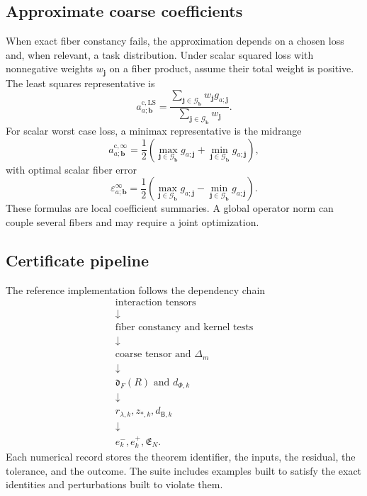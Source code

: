 \documentclass[11pt]{article}
\theoremstyle{definition}
\theoremstyle{remark}
\newcommand{\cG}{\mathcal G}
\newcommand{\coarse}{\mathrm c}
\newcommand{\Bup}{\mathsf B}
\newcommand{\Err}{\mathfrak E}
\begin{document}
\subsection{Approximate coarse coefficients}
When exact fiber constancy fails, the approximation depends on a chosen loss and, when relevant, a task distribution.  Under scalar squared loss with nonnegative weights $w_{\mathbf j}$ on a fiber product, assume their total weight is positive.  The least squares representative is
\begin{equation}\label{eq:least-squares-coarse-coeff}
  a^{\coarse,\mathrm{LS}}_{a;\mathbf b}
  =
  \frac{
  \sum_{\mathbf j\in\cG_{\mathbf b}}
  w_{\mathbf j}g_{a;\mathbf j}
  }{
  \sum_{\mathbf j\in\cG_{\mathbf b}}w_{\mathbf j}
  }.
\end{equation}
For scalar worst case loss, a minimax representative is the midrange
\begin{equation}\label{eq:minimax-coarse-coeff}
  a^{\coarse,\infty}_{a;\mathbf b}
  =
  \frac12
  \left(
  \max_{\mathbf j\in\cG_{\mathbf b}}g_{a;\mathbf j}
  +
  \min_{\mathbf j\in\cG_{\mathbf b}}g_{a;\mathbf j}
  \right),
\end{equation}
with optimal scalar fiber error
\begin{equation}\label{eq:minimax-fiber-error}
  \varepsilon^{\infty}_{a;\mathbf b}
  =
  \frac12
  \left(
  \max_{\mathbf j\in\cG_{\mathbf b}}g_{a;\mathbf j}
  -
  \min_{\mathbf j\in\cG_{\mathbf b}}g_{a;\mathbf j}
  \right).
\end{equation}
These formulas are local coefficient summaries.  A global operator norm can couple several fibers and may require a joint optimization.

\subsection{Certificate pipeline}
The reference implementation follows the dependency chain
\[
\begin{array}{c}
\text{interaction tensors}\\
\downarrow\\
\text{fiber constancy and kernel tests}\\
\downarrow\\
\text{coarse tensor and }\Delta_m\\
\downarrow\\
\mathfrak d_F(R)\text{ and }d_{\Phi,k}\\
\downarrow\\
 r_{\lambda,k},z_{*,k},d_{\Bup,k}\\
\downarrow\\
 e_k^-,e_k^+,\Err_N.
\end{array}
\]
Each numerical record stores the theorem identifier, the inputs, the residual, the tolerance, and the outcome.  The suite includes examples built to satisfy the exact identities and perturbations built to violate them.
\end{document}
